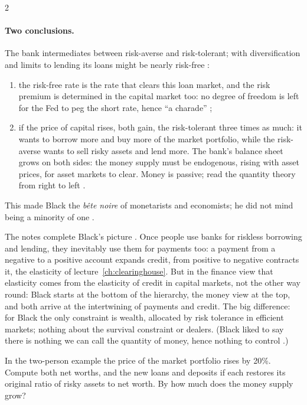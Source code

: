 \begin{paracol}{2}
\paragraph{Two conclusions.} The bank intermediates between risk-averse and risk-tolerant; with diversification and limits to lending its loans might be nearly risk-free
:
\begin{enumerate}
  \item the risk-free rate is the rate that clears this loan market, and the risk premium is determined in the capital market too: no degree of freedom is left for the Fed
        to peg the short rate, hence ``a charade'' ;
  \item if the price of capital rises, both gain, the risk-tolerant three times as much: it wants to borrow more and buy more of the market portfolio, while the risk-averse
        wants to sell risky assets and lend more. The bank's balance sheet grows on both sides: the money supply must be endogenous, rising with asset prices, for asset
        markets to clear. Money is passive; read the quantity theory from right to left .
\end{enumerate}
This made Black the \emph{b\^ete noire} of monetarists and economists; he did not mind being a minority of one .

The notes complete Black's picture . Once people use banks for riskless borrowing and lending, they inevitably use them for payments too: a payment from a negative to a
positive account expands credit, from positive to negative contracts it, the elasticity of lecture~\ref{ch:clearinghouse}. But in the finance view that elasticity comes from the elasticity of
credit in capital markets, not the other way round: Black starts at the bottom of the hierarchy, the money view at the top, and both arrive at the intertwining of payments and credit. The big
difference: for Black the only constraint is wealth, allocated by risk tolerance in efficient markets; nothing about the survival constraint or dealers. (Black liked to say there is nothing we can
call the quantity of money, hence nothing to control .)

\begin{exercise}
In the two-person example the price of the market portfolio rises by 20\%. Compute both net worths, and the new loans and deposits if each restores its original ratio of
risky assets to net worth. By how much does the money supply grow?
\end{exercise}


\end{paracol}
